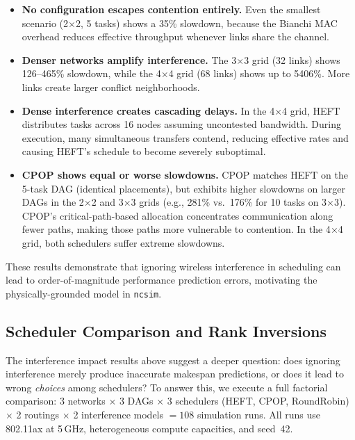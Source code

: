 \documentclass[conference]{IEEEtran}
\newcommand{\ncsim}{\texttt{ncsim}}
\begin{document}
\begin{itemize}[itemsep=1pt,leftmargin=*]
\item \textbf{No configuration escapes contention entirely.}  Even the
  smallest scenario (2$\times$2, 5 tasks) shows a 35\% slowdown, because
  the Bianchi MAC overhead reduces effective throughput whenever links
  share the channel.
\item \textbf{Denser networks amplify interference.}  The 3$\times$3 grid
  (32 links) shows 126--465\% slowdown, while the 4$\times$4 grid (68 links)
  shows up to 5406\%.  More links create larger conflict neighborhoods.
\item \textbf{Dense interference creates cascading delays.}  In the
  4$\times$4 grid, HEFT distributes tasks across 16 nodes assuming
  uncontested bandwidth.  During execution, many simultaneous transfers
  contend, reducing effective rates and causing HEFT's schedule to
  become severely suboptimal.
\item \textbf{CPOP shows equal or worse slowdowns.}  CPOP matches HEFT
  on the 5-task DAG (identical placements), but exhibits higher slowdowns
  on larger DAGs in the 2$\times$2 and 3$\times$3 grids (e.g., 281\%
  vs.\ 176\% for 10 tasks on 3$\times$3).  CPOP's critical-path-based
  allocation concentrates communication along fewer paths, making those
  paths more vulnerable to contention.  In the 4$\times$4 grid, both
  schedulers suffer extreme slowdowns.
\end{itemize}

\noindent These results demonstrate that ignoring wireless interference in
scheduling can lead to order-of-magnitude performance prediction errors,
motivating the physically-grounded model in \ncsim{}.


\subsection{Scheduler Comparison and Rank Inversions}
\label{sec:scheduler_eval}

The interference impact results above suggest a deeper question: does
ignoring interference merely produce inaccurate makespan predictions, or
does it lead to wrong \emph{choices} among schedulers?  To answer this, we
execute a full factorial comparison: 3 networks $\times$ 3 DAGs $\times$
3 schedulers (HEFT, CPOP, RoundRobin) $\times$ 2 routings $\times$ 2
interference models $= 108$ simulation runs.  All runs use 802.11ax at
5\,GHz, heterogeneous compute capacities, and seed~42.
\end{document}
